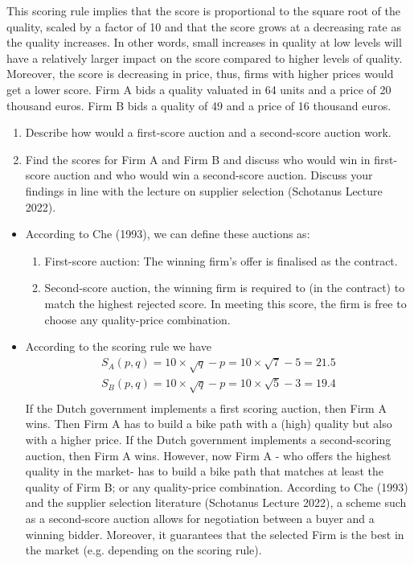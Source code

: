 \documentclass[11pt]{article} %
\begin{document}
 This scoring rule implies that the score is proportional to the square root of the quality, scaled by a factor of 10 and that the score grows at a decreasing rate as the quality increases. In other words, small increases in quality at low levels will have a relatively larger impact on the score compared to higher levels of quality. Moreover, the score is decreasing in price, thus, firms with higher prices would get a lower score.
Firm A bids a quality valuated in 64 units and a price of 20 thousand euros. Firm B bids a quality of 49 and a price of 16 thousand euros. 


\begin{enumerate}
        \item Describe how would a first-score auction and a second-score auction work.
        \item Find the scores for Firm A and Firm B and discuss who would win in first-score auction and who would win a second-score auction. Discuss your findings in line with the lecture on supplier selection (Schotanus Lecture 2022).
    \end{enumerate}
    
    
    \begin{itemize}
        \item According to Che (1993), we can define these auctions as:
        \begin{enumerate}
            \item First-score auction: The winning firm’s offer is finalised as the contract. 
            \item Second-score auction, the winning firm is required to (in the contract) to match the highest rejected score. In meeting this score, the firm is free to choose any quality-price combination.
        \end{enumerate}
        \item According to the scoring rule we have
        \begin{align*}
            S_{A}(p,q) = 10 \times \sqrt{q}-p = 10\times\sqrt{7} - 5  = 21.5 \\
            S_{B}(p,q) = 10 \times \sqrt{q}-p = 10\times\sqrt{5} - 3  = 19.4 \\
        \end{align*}
        If the Dutch government implements a first scoring auction, then Firm A wins. Then Firm A has to build a bike path with a (high) quality but also with a higher price.
        If the Dutch government implements a second-scoring auction, then Firm A wins. However, now Firm A - who offers the highest quality in the market- has to build a bike path that matches at least the quality of Firm B; or any quality-price combination. 
        According to Che (1993) and the supplier selection literature (Schotanus Lecture 2022), a scheme such as a second-score auction allows for negotiation between a buyer and a winning bidder. Moreover, it guarantees that the selected Firm is the best in the market (e.g. depending on the scoring rule).
         \end{itemize}
\end{document}
